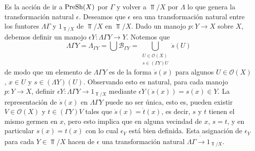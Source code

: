 Es la acción de ir a $\normalfont{\text{PreSh}}(X)$ por $\Gamma$ y volver a $\Top/X$ por $\Lambda$ lo que genera la transformación natural $\epsilon$. Deseamos que $\epsilon$ sea una transformación natural entre los funtores $\Lambda \Gamma$ y $1_{\Top/X}$ de $\Top/X$ en $\Top/X$. Dado un manojo $p:Y\to X$ sobre $X$, debemos definir un manojo $\epsilon Y:\Lambda \Gamma Y \to Y$. Notemos que
$$
   \Lambda \Gamma Y = \Lambda_{\Gamma Y} = \bigcup \mathcal{B}_{\Gamma Y} = \bigcup_{\substack{U\in\mathcal{O}(X)\\s\in(\Gamma Y)U}}\dot{s}(U)
$$
de modo que un elemento de $\Lambda \Gamma Y$ es de la forma $\dot{s}(x)$ para algunos $U\in\mathcal{O}(X)$, $x\in U$ y $s\in(\Lambda Y)(U)$. Observando esto es natural, para cada manojo $p:Y\to X$, definir $\epsilon Y:\Lambda \Gamma Y\to 1_{\Top/X}$ mediante $\epsilon Y (\dot{s}(x))=s(x)\in Y$. La representación de $\dot{s}(x)$ en $\Lambda \Gamma Y$ puede no ser única, esto es, pueden existir $V\in \mathcal{O}(X)$ y $t\in(\Gamma Y)V$ tales que $\dot{s}(x)=\dot{t}(x)$, es decir, $s$ y $t$ tienen el mismo germen en $x$, pero esto implica que en alguna vecindad de $x$, $s=t$, y en particular $s(x)=t(x)$ con lo cual $\epsilon_{Y}$ está bien definida. Esta asignación de $\epsilon_{Y}$ para cada $Y\in\Top/X$ hacen de $\epsilon$ una transformación natural $\Lambda \Gamma \dot{\to} 1_{\Top/X}$.
